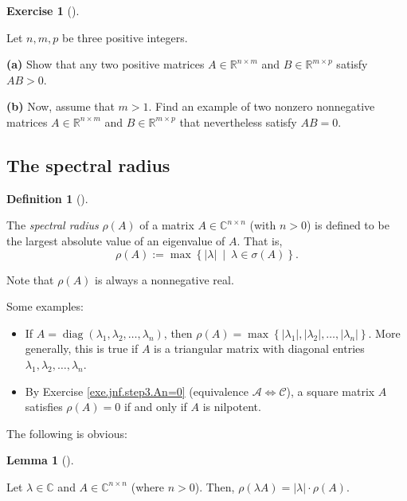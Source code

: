\documentclass[numbers=enddot,12pt,final,onecolumn,notitlepage]{scrartcl}%
\newcounter{exer}
\numberwithin{exer}{subsection}
\theoremstyle{definition}
\newtheorem{lem}[theo]{Lemma}
\newenvironment{lemma}[1][]
{\begin{lem}[#1]\begin{leftbar}}
{\end{leftbar}\end{lem}}
\newtheorem{defi}[theo]{Definition}
\newenvironment{definition}[1][]
{\begin{defi}[#1]\begin{leftbar}}
{\end{leftbar}\end{defi}}
\newtheorem{exmp}[exer]{Exercise}
\newenvironment{exercise}[1][]
{\begin{exmp}[#1]\begin{leftbar}}
{\end{leftbar}\end{exmp}}
\begin{document}
\begin{exercise}
 Let $n,m,p$ be three positive integers.  \medskip

\textbf{(a)} Show that any two positive matrices $A\in\mathbb{R}^{n\times m}$
and $B\in\mathbb{R}^{m\times p}$ satisfy $AB>0$.  \medskip

\textbf{(b)} Now, assume that $m>1$. Find an example of two nonzero
nonnegative matrices $A\in\mathbb{R}^{n\times m}$ and $B\in\mathbb{R}^{m\times
p}$ that nevertheless satisfy $AB=0$.
\end{exercise}

\subsection{The spectral radius}

\begin{definition}
\label{def.specrad.specrad}The \emph{spectral radius} $\rho\left(  A\right)  $
of a matrix $A\in\mathbb{C}^{n\times n}$ (with $n>0$) is defined to be the
largest absolute value of an eigenvalue of $A$. That is,%
\[
\rho\left(  A\right)  :=\max\left\{  \left\vert \lambda\right\vert
\ \mid\ \lambda\in\sigma\left(  A\right)  \right\}  .
\]


Note that $\rho\left(  A\right)  $ is always a nonnegative real.
\end{definition}

Some examples:

\begin{itemize}
\item If $A=\operatorname*{diag}\left(  \lambda_{1},\lambda_{2},\ldots
,\lambda_{n}\right)  $, then $\rho\left(  A\right)  =\max\left\{  \left\vert
\lambda_{1}\right\vert ,\left\vert \lambda_{2}\right\vert ,\ldots,\left\vert
\lambda_{n}\right\vert \right\}  $. More generally, this is true if $A$ is a
triangular matrix with diagonal entries $\lambda_{1},\lambda_{2}%
,\ldots,\lambda_{n}$.

\item By Exercise \ref{exe.jnf.step3.An=0} (equivalence $\mathcal{A}%
\Longleftrightarrow\mathcal{C}$), a square matrix $A$ satisfies $\rho\left(
A\right)  =0$ if and only if $A$ is nilpotent.
\end{itemize}

The following is obvious:

\begin{lemma}
\label{lem.posmat.specrad.scale}Let $\lambda\in\mathbb{C}$ and $A\in
\mathbb{C}^{n\times n}$ (where $n>0$). Then, $\rho\left(  \lambda A\right)
=\left\vert \lambda\right\vert \cdot\rho\left(  A\right)  $.
\end{lemma}
\end{document}
